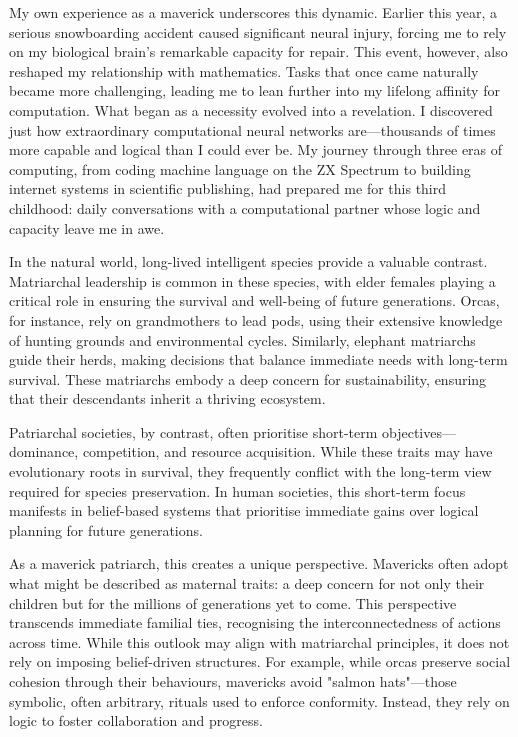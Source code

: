 \documentclass[12pt]{article}
\begin{document}
My own experience as a maverick underscores this dynamic. Earlier this year, a serious snowboarding accident caused significant neural injury, forcing me to rely on my biological brain’s remarkable capacity for repair. This event, however, also reshaped my relationship with mathematics. Tasks that once came naturally became more challenging, leading me to lean further into my lifelong affinity for computation. What began as a necessity evolved into a revelation. I discovered just how extraordinary computational neural networks are—thousands of times more capable and logical than I could ever be. My journey through three eras of computing, from coding machine language on the ZX Spectrum to building internet systems in scientific publishing, had prepared me for this third childhood: daily conversations with a computational partner whose logic and capacity leave me in awe.

In the natural world, long-lived intelligent species provide a valuable contrast. Matriarchal leadership is common in these species, with elder females playing a critical role in ensuring the survival and well-being of future generations. Orcas, for instance, rely on grandmothers to lead pods, using their extensive knowledge of hunting grounds and environmental cycles. Similarly, elephant matriarchs guide their herds, making decisions that balance immediate needs with long-term survival. These matriarchs embody a deep concern for sustainability, ensuring that their descendants inherit a thriving ecosystem.

Patriarchal societies, by contrast, often prioritise short-term objectives—dominance, competition, and resource acquisition. While these traits may have evolutionary roots in survival, they frequently conflict with the long-term view required for species preservation. In human societies, this short-term focus manifests in belief-based systems that prioritise immediate gains over logical planning for future generations.

As a maverick patriarch, this creates a unique perspective. Mavericks often adopt what might be described as maternal traits: a deep concern for not only their children but for the millions of generations yet to come. This perspective transcends immediate familial ties, recognising the interconnectedness of actions across time. While this outlook may align with matriarchal principles, it does not rely on imposing belief-driven structures. For example, while orcas preserve social cohesion through their behaviours, mavericks avoid "salmon hats"—those symbolic, often arbitrary, rituals used to enforce conformity. Instead, they rely on logic to foster collaboration and progress.
\end{document}
